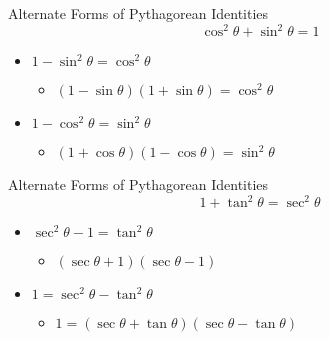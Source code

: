 \documentclass[t,usenames,dvipsnames]{beamer}
\begin{document}
\begin{frame}{Alternate Forms of Pythagorean Identities}
    \[
    \cos^2\theta + \sin^2\theta = 1
    \]
    \pause
    \begin{itemize}
        \item $1 - \sin^2\theta = \cos^2\theta$ \newline\\  \pause
        \begin{itemize}
            \item $(1-\sin\theta)(1+\sin\theta) = \cos^2\theta$ \newline\\  \pause
        \end{itemize}
        \item $1 - \cos^2\theta = \sin^2\theta$ \newline\\  \pause
        \begin{itemize}
            \item $(1+\cos\theta)(1-\cos\theta) = \sin^2\theta$
        \end{itemize}
    \end{itemize}
\end{frame}

\begin{frame}{Alternate Forms of Pythagorean Identities}
    \[
    1 + \tan^2\theta = \sec^2\theta
    \]
    \pause
    \begin{itemize}
        \item $\sec^2\theta - 1 = \tan^2\theta$ \newline\\  \pause
        \begin{itemize}
            \item $(\sec\theta + 1)(\sec\theta - 1)$ \newline\\  \pause
        \end{itemize}
        \item $1 = \sec^2\theta - \tan^2\theta$ \newline\\  \pause
        \begin{itemize}
            \item $1 = (\sec\theta + \tan\theta)(\sec\theta - \tan\theta)$
        \end{itemize}
    \end{itemize}
\end{frame}
\end{document}

